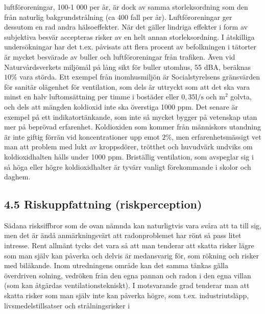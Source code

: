 luftföroreningar, 100-1 000 per år, är dock av samma storleksordning som den från naturlig bakgrundstrålning (ca 400 fall per år). Luftföroreningar ger dessutom en rad andra hälsoeffekter.
När det gäller lindriga effekter i form av subjektiva besvär accepteras risker av en helt annan storleksordning. I åtskilliga undersökningar har det t.ex. påvisats att flera procent av befolkningen i tätorter är mycket besvärade av buller och luftföroreningar från trafiken. Även vid Naturvårdsverkets miljömål på lång sikt för buller utomhus, 55 dBA, beräknas \(10 \%\) vara störda.
Ett exempel från inomhusmiljön är Socialstyrelsens gränsvärden för sanitär olägenhet för ventilation, som dels är uttryckt som att det ska vara minst en halv luftomsättning per timme i bostäder eller \(0,35 \mathrm{l} / \mathrm{s}\) och \(\mathrm{m}^{2}\) golvta, och dels att mängden koldioxid inte ska överstiga 1000 ppm. Det senare är exempel på ett indikatortänkande, som inte så mycket bygger på vetenskap utan mer på beprövad erfarenhet. Koldioxiden som kommer från människors utandning är inte giftig förrän vid koncentrationer upp emot \(2 \%\), men erfarenhetsmässigt vet man att problem med lukt av kroppsdörer, trötthet och huvudvärk undviks om koldioxidhalten hålls under 1000 ppm. Briställig ventilation, som avspeglar sig i så höga eller högre koldioxidhalter är tyvärr vanligt förekommande i skolor och daghem.
\subsection*{4.5 Riskuppfattning (riskperception)}
Sädana risksiffbror som de ovan nämnda kan naturligtvis vara svåra att ta till sig, men det är ändå anmärkningsvärt att radonproblemet har rönt så pass litet intresse. Rent allmänt tycks det vara så att man tenderar att skatta risker lägre som man själv kan påverka och delvis är medansvarig för, som rökning och risker med biläkande. Inom utredningens område kan det samma tänkas gälla överdriven solning, vedröken från den egna pannan och radon i den egna villan (som kan åtgärdas ventilationstekniskt). I motsvarande grad tenderar man att skatta risker som man själv inte kan påverka högre, som t.ex. industriutsläpp, livsmedelstillsatser och strålningsrisker i

